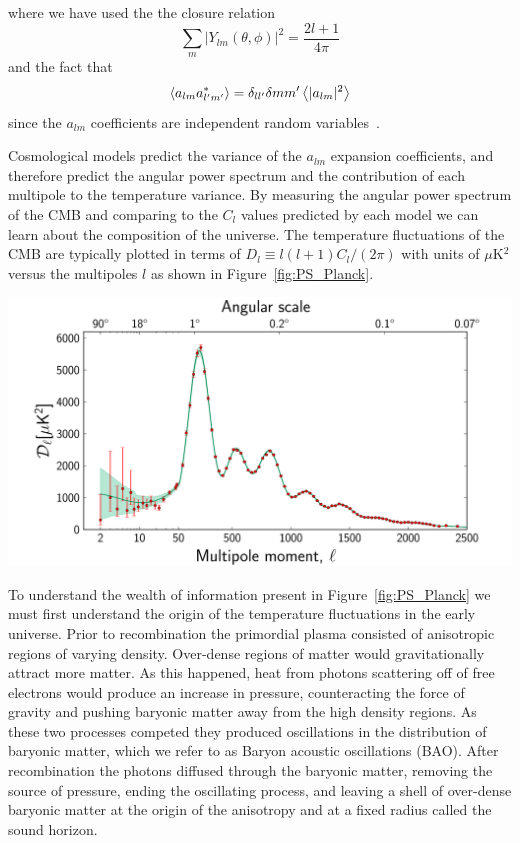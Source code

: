 where we have used the the closure relation
\begin{equation}\label{closure}
\sum_m |Y_{lm}(\theta,\phi)|^2 = \frac{2l+1}{4\pi}
\end{equation} and the fact that
\begin{equation}\label{alm_var1}
\left< a_{lm}a_{l'm'}^* \right> = \delta_{ll'}\delta{mm'}\left< |a_{lm}|^2 \right>
\end{equation}
since the $a_{lm}$ coefficients are independent random variables~\cite{Kurki-Suonio}.


Cosmological models predict the variance of the $a_{lm}$ expansion coefficients, and therefore predict the angular power spectrum and the contribution of each multipole to the temperature variance.  By measuring the angular power spectrum of the CMB and comparing to the $C_l$ values predicted by each model we can learn about the composition of the universe.  The temperature fluctuations of the CMB are typically plotted in terms of $D_l \equiv l(l+1)C_l/(2\pi)$ with units of $\mu$K$^2$ versus the multipoles $l$ as shown in Figure~\ref{fig:PS_Planck}.

\begin{center} 
\includegraphics[scale=0.4]{PS_Planck.png}
\label{fig:PS_Planck}
\end{center} 


To understand the wealth of information present in Figure~\ref{fig:PS_Planck} we must first understand the origin of the temperature fluctuations in the early universe.  Prior to recombination the primordial plasma consisted of anisotropic regions of varying density. Over-dense regions of matter would gravitationally attract more matter.  As this happened, heat from photons scattering off of free electrons would produce an increase in pressure, counteracting the force of gravity and pushing baryonic matter away from the high density regions.  As these two processes competed they produced oscillations in the distribution of baryonic matter, which we refer to as Baryon acoustic oscillations (BAO).  After recombination the photons diffused through the baryonic matter, removing the source of pressure, ending the oscillating process, and leaving a shell of over-dense baryonic matter at the origin of the anisotropy and at a fixed radius called the sound horizon.

